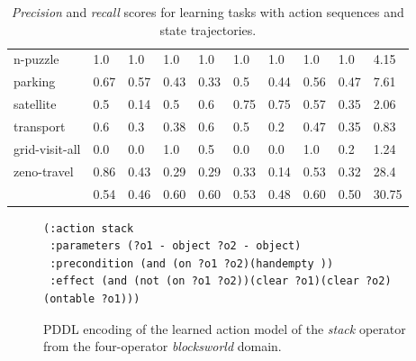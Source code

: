 \begin{table}[hbt!]
\begin{center}
\begin{footnotesize}
\begin{tabular}{l|l|l|l|l|l|l||l|l||l|}
			n-puzzle & 1.0 & 1.0 & 1.0 & 1.0 & 1.0 & 1.0 & 1.0 & 1.0& 4.15 \\ %
			parking & 0.67 & 0.57 & 0.43 & 0.33 & 0.5 & 0.44 & 0.56 & 0.47& 7.61 \\ %
			satellite & 0.5 & 0.14 & 0.5 & 0.6 & 0.75 & 0.75 & 0.57 & 0.35& 2.06 \\ %
			transport & 0.6 & 0.3 & 0.38 & 0.6 & 0.5 & 0.2 & 0.47 & 0.35& 0.83 \\ %
			grid-visit-all & 0.0 & 0.0 & 1.0 & 0.5 & 0.0 & 0.0 & 1.0 & 0.2& 1.24 \\ %
			zeno-travel & 0.86 & 0.43 & 0.29 & 0.29 & 0.33 & 0.14 & 0.53 & 0.32& 28.4 \\ %
			\hline
			\bf & 0.54 & 0.46 & 0.60 & 0.60 & 0.53 & 0.48 & 0.60 & 0.50 & 30.75
		\end{tabular}
            \end{footnotesize}    
	\end{center}
	\caption{\small {\em Precision} and {\em recall} scores for learning tasks with \NO action sequences and \NO state trajectories.}
	\label{tab:results_minimum_0_0}
\end{table}


\begin{figure}[hbt!]
	\begin{footnotesize}
		\begin{verbatim}
(:action stack
 :parameters (?o1 - object ?o2 - object)
 :precondition (and (on ?o1 ?o2)(handempty ))
 :effect (and (not (on ?o1 ?o2))(clear ?o1)(clear ?o2)(ontable ?o1)))
		\end{verbatim}
	\end{footnotesize}
	\caption{PDDL encoding of the learned action model of the {\em stack} operator from the four-operator {\em blocksworld} domain.}
	\label{fig:macroaction}
\end{figure}


